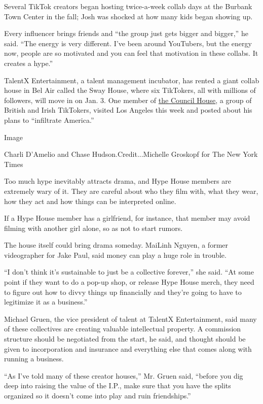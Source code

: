 Several TikTok creators began hosting twice-a-week collab days at the
Burbank Town Center in the fall; Josh was shocked at how many kids began
showing up.

Every influencer brings friends and ``the group just gets bigger and
bigger,'' he said. ``The energy is very different. I've been around
YouTubers, but the energy now, people are so motivated and you can feel
that motivation in these collabs. It creates a hype.''

TalentX Entertainment, a talent management incubator, has rented a giant
collab house in Bel Air called the Sway House, where six TikTokers, all
with millions of followers, will move in on Jan. 3. One member of
\href{https://vm.tiktok.com/CPQrX7/}{the Council House}, a group of
British and Irish TikTokers, visited Los Angeles this week and posted
about his plans to ``infiltrate America.''

Image

Charli D'Amelio and Chase Hudson.Credit...Michelle Groskopf for The New
York Times

Too much hype inevitably attracts drama, and Hype House members are
extremely wary of it. They are careful about who they film with, what
they wear, how they act and how things can be interpreted online.

If a Hype House member has a girlfriend, for instance, that member may
avoid filming with another girl alone, so as not to start rumors.

The house itself could bring drama someday. MaiLinh Nguyen, a former
videographer for Jake Paul, said money can play a huge role in trouble.

``I don't think it's sustainable to just be a collective forever,'' she
said. ``At some point if they want to do a pop-up shop, or release Hype
House merch, they need to figure out how to divvy things up financially
and they're going to have to legitimize it as a business.''

Michael Gruen, the vice president of talent at TalentX Entertainment,
said many of these collectives are creating valuable intellectual
property. A commission structure should be negotiated from the start, he
said, and thought should be given to incorporation and insurance and
everything else that comes along with running a business.

``As I've told many of these creator houses,'' Mr. Gruen said, ``before
you dig deep into raising the value of the I.P., make sure that you have
the splits organized so it doesn't come into play and ruin
friendships.''

